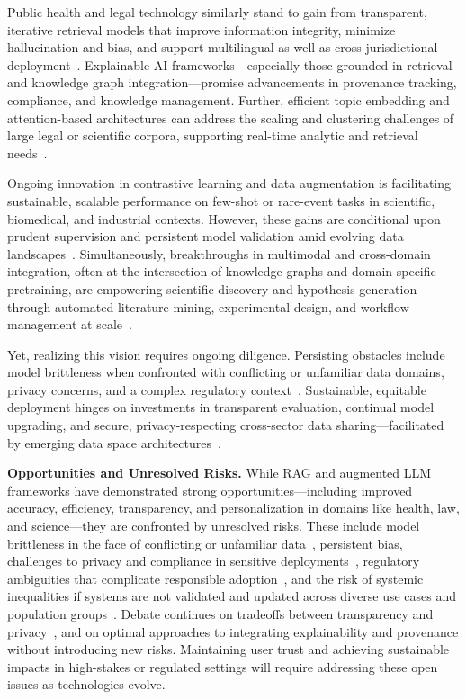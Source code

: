 \documentclass[sigconf]{acmart}
\begin{document}
Public health and legal technology similarly stand to gain from transparent, iterative retrieval models that improve information integrity, minimize hallucination and bias, and support multilingual as well as cross-jurisdictional deployment~\cite{ref10, ref20, ref36, ref38}. Explainable AI frameworks—especially those grounded in retrieval and knowledge graph integration—promise advancements in provenance tracking, compliance, and knowledge management. Further, efficient topic embedding and attention-based architectures can address the scaling and clustering challenges of large legal or scientific corpora, supporting real-time analytic and retrieval needs~\cite{ref13, ref19, ref21}.

Ongoing innovation in contrastive learning and data augmentation is facilitating sustainable, scalable performance on few-shot or rare-event tasks in scientific, biomedical, and industrial contexts. However, these gains are conditional upon prudent supervision and persistent model validation amid evolving data landscapes~\cite{ref58, ref59, ref60}. Simultaneously, breakthroughs in multimodal and cross-domain integration, often at the intersection of knowledge graphs and domain-specific pretraining, are empowering scientific discovery and hypothesis generation through automated literature mining, experimental design, and workflow management at scale~\cite{ref12, ref15, ref19, ref24, ref61}.

Yet, realizing this vision requires ongoing diligence. Persisting obstacles include model brittleness when confronted with conflicting or unfamiliar data domains, privacy concerns, and a complex regulatory context~\cite{ref4, ref36, ref40, ref48}. Sustainable, equitable deployment hinges on investments in transparent evaluation, continual model upgrading, and secure, privacy-respecting cross-sector data sharing—facilitated by emerging data space architectures~\cite{ref34, ref39, ref50}.

\vspace{2mm}
\noindent
\textbf{Opportunities and Unresolved Risks.} While RAG and augmented LLM frameworks have demonstrated strong opportunities—including improved accuracy, efficiency, transparency, and personalization in domains like health, law, and science—they are confronted by unresolved risks. These include model brittleness in the face of conflicting or unfamiliar data~\cite{ref9}, persistent bias, challenges to privacy and compliance in sensitive deployments~\cite{ref36, ref48}, regulatory ambiguities that complicate responsible adoption~\cite{ref4, ref50}, and the risk of systemic inequalities if systems are not validated and updated across diverse use cases and population groups~\cite{ref5}. Debate continues on tradeoffs between transparency and privacy~\cite{ref36}, and on optimal approaches to integrating explainability and provenance without introducing new risks. Maintaining user trust and achieving sustainable impacts in high-stakes or regulated settings will require addressing these open issues as technologies evolve.
\end{document}
